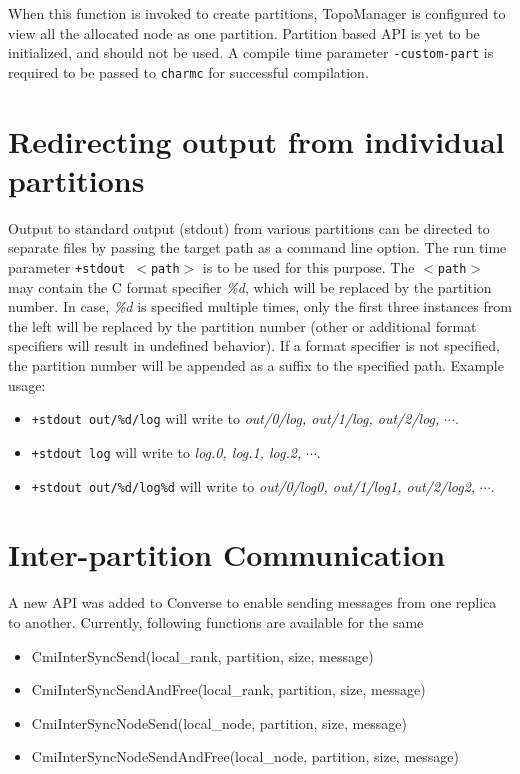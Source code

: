 \begin{itemize}
When this function is invoked to create partitions, TopoManager is configured to 
view all the allocated node as one partition. Partition based API is yet to be 
initialized, and should not be used. A compile time parameter {\tt -custom-part} 
is required to be passed to {\tt charmc} for successful compilation.
\end{itemize}

\section{Redirecting output from individual partitions}
Output to standard output (stdout) from various partitions can be directed 
to separate files by passing the target path as a command line option. The run
time parameter {\tt +stdout $<$path$>$} is to be used for this purpose. The
{\tt $<$path$>$} may contain the C format specifier \emph{\%d}, which will be replaced by the
partition number. In case, \emph{\%d} is specified multiple times, only the first
three instances from the left will be replaced by the partition number (other or additional format specifiers will result in undefined behavior). If a format specifier is not specified, 
the partition number will be appended as a suffix to the specified path. Example usage:

\begin{itemize}
\item {\tt +stdout out/\%d/log} will write to \emph{out/0/log, out/1/log,
out/2/log,} $\cdots$.
\item {\tt +stdout log} will write to \emph{log.0, log.1, log.2,} $\cdots$.
\item {\tt +stdout out/\%d/log\%d} will write to \emph{out/0/log0, out/1/log1,
out/2/log2,} $\cdots$.
\end{itemize}

\section{Inter-partition Communication}

A new API was added to Converse to enable sending messages from one replica to
another. Currently, following functions are available for the same
\begin{itemize}
\item CmiInterSyncSend(local\_rank, partition, size, message)        
\item CmiInterSyncSendAndFree(local\_rank, partition, size, message)
\item CmiInterSyncNodeSend(local\_node, partition, size, message)        
\item CmiInterSyncNodeSendAndFree(local\_node, partition, size, message)
\end{itemize}

